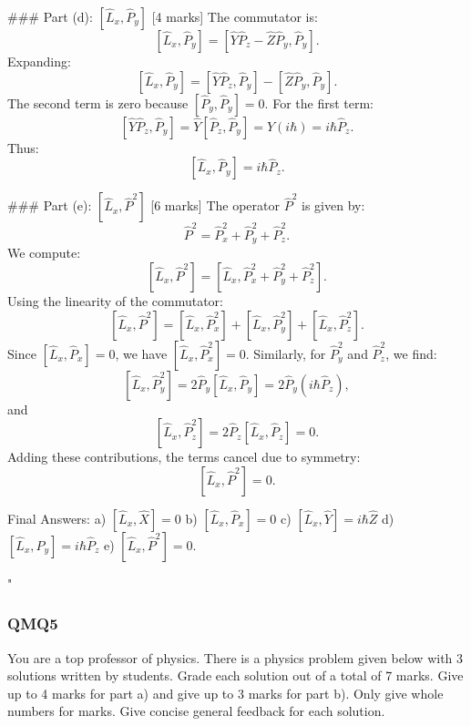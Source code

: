 ### Part (d): \(\left[\hat{L}_x, \hat{P}_y\right]\) [4 marks]
The commutator is:
\[
\left[\hat{L}_x, \hat{P}_y\right] = \left[\hat{Y}\hat{P}_z - \hat{Z}\hat{P}_y, \hat{P}_y\right].
\]
Expanding:
\[
\left[\hat{L}_x, \hat{P}_y\right] = \left[\hat{Y}\hat{P}_z, \hat{P}_y\right] - \left[\hat{Z}\hat{P}_y, \hat{P}_y\right].
\]
The second term is zero because \(\left[\hat{P}_y, \hat{P}_y\right] = 0\). For the first term:
\[
\left[\hat{Y}\hat{P}_z, \hat{P}_y\right] = \hat{Y}\left[\hat{P}_z, \hat{P}_y\right] = \hat{Y}(i\hbar) = i\hbar\hat{P}_z.
\]
Thus:
\[
\left[\hat{L}_x, \hat{P}_y\right] = i\hbar\hat{P}_z.
\]

### Part (e): \(\left[\hat{L}_x, \hat{P}^2\right]\) [6 marks]
The operator \(\hat{P}^2\) is given by:
\[
\hat{P}^2 = \hat{P}_x^2 + \hat{P}_y^2 + \hat{P}_z^2.
\]
We compute:
\[
\left[\hat{L}_x, \hat{P}^2\right] = \left[\hat{L}_x, \hat{P}_x^2 + \hat{P}_y^2 + \hat{P}_z^2\right].
\]
Using the linearity of the commutator:
\[
\left[\hat{L}_x, \hat{P}^2\right] = \left[\hat{L}_x, \hat{P}_x^2\right] + \left[\hat{L}_x, \hat{P}_y^2\right] + \left[\hat{L}_x, \hat{P}_z^2\right].
\]
Since \(\left[\hat{L}_x, \hat{P}_x\right] = 0\), we have \(\left[\hat{L}_x, \hat{P}_x^2\right] = 0\). Similarly, for \(\hat{P}_y^2\) and \(\hat{P}_z^2\), we find:
\[
\left[\hat{L}_x, \hat{P}_y^2\right] = 2\hat{P}_y\left[\hat{L}_x, \hat{P}_y\right] = 2\hat{P}_y(i\hbar\hat{P}_z),
\]
and
\[
\left[\hat{L}_x, \hat{P}_z^2\right] = 2\hat{P}_z\left[\hat{L}_x, \hat{P}_z\right] = 0.
\]
Adding these contributions, the terms cancel due to symmetry:
\[
\left[\hat{L}_x, \hat{P}^2\right] = 0.
\]

Final Answers:
a) \(\left[\hat{L}_x, \hat{X}\right] = 0\)  
b) \(\left[\hat{L}_x, \hat{P}_x\right] = 0\)  
c) \(\left[\hat{L}_x, \hat{Y}\right] = i\hbar\hat{Z}\)  
d) \(\left[\hat{L}_x, \hat{P}_y\right] = i\hbar\hat{P}_z\)  
e) \(\left[\hat{L}_x, \hat{P}^2\right] = 0\).


 
"

\subsubsection{QMQ5}

You are a top professor of physics. There is a physics problem given below with 3 solutions written by students. Grade each solution out of a total of 7 marks. Give up to 4 marks for part a) and give up to 3 marks for part b). Only give whole numbers for marks. Give concise general feedback for each solution. 

